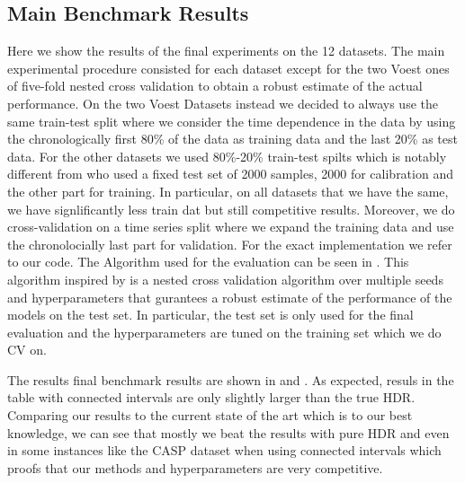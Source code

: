 \subsection{Main Benchmark Results}
Here we show the results of the final experiments on the 12 datasets. The main experimental procedure consisted for each dataset except for the two Voest ones of five-fold nested cross validation to obtain a robust estimate of the actual performance. On the two Voest Datasets instead we decided to always use the same train-test split where we consider the time dependence in the data by using the chronologically first 80\% of the data as training data and the last 20\% as test data. For the other datasets we used 80\%-20\% train-test spilts which is notably different from \cite{sesia2021conformal} who used a fixed test set of 2000 samples, 2000 for calibration and the other part for training. In particular, on all datasets that we have the same, we have signlificantly less train dat but still competitive results.  Moreover, we do cross-validation on a time series split where we expand the training data and use the chronolocially last part for validation. For the exact implementation we refer to our code. The Algorithm used for the evaluation can be seen in . This algorithm inspired by \cite{rothfuss2019noise} is a nested cross validation algorithm over multiple seeds and hyperparameters that gurantees a robust estimate of the performance of the models on the test set. In particular, the test set is only used for the final evaluation and the hyperparameters are tuned on the training set which we do CV on.

The results final benchmark results are shown in  and . As expected, resuls in the table with connected intervals are only slightly larger than the true HDR. Comparing our results to the current state of the art which is \cite{sesia2021conformal} to our best knowledge, we can see that mostly we beat the results with pure HDR and even in some instances like the CASP dataset when using connected intervals which proofs that our methods and hyperparameters are very competitive. 

